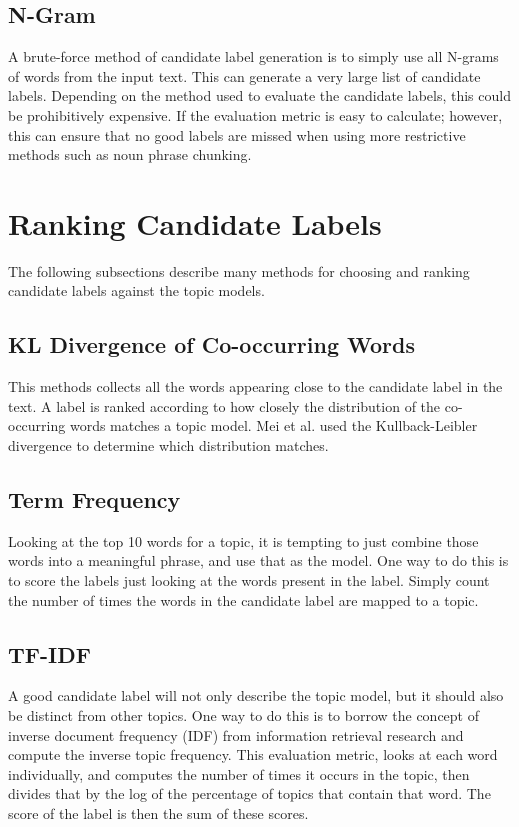 \subsection{N-Gram}
A brute-force method of candidate label generation is to simply use all N-grams of words from the input text.  This can generate a very large list of candidate labels.  Depending on the method used to evaluate the candidate labels, this could be prohibitively expensive.  If the evaluation metric is easy to calculate; however, this can ensure that no good labels are missed when using more restrictive methods such as noun phrase chunking.

\section{Ranking Candidate Labels}
The following subsections describe many methods for choosing and ranking candidate labels against the topic models.

\subsection{KL Divergence of Co-occurring Words}
This methods collects all the words appearing close to the candidate label in the text. A label is ranked according to how closely the distribution of the co-occurring words matches a topic model.  Mei et al. \cite{mei2007automatic} used the Kullback-Leibler divergence to determine which distribution matches.

\subsection{Term Frequency}
Looking at the top 10 words for a topic, it is tempting to just combine those words into a meaningful phrase, and use that as the model.  One way to do this is to score the labels just looking at the words present in the label.  Simply count the number of times the words in the candidate label are mapped to a topic.

\subsection{TF-IDF}
A good candidate label will not only describe the topic model, but it should also be distinct from other topics.  One way to do this is to borrow the concept of inverse document frequency (IDF) from information retrieval research and compute the inverse topic frequency.  This evaluation metric, looks at each word individually, and computes the number of times it occurs in the topic, then divides that by the log of the percentage of topics that contain that word.  The score of the label is then the sum of these scores.

